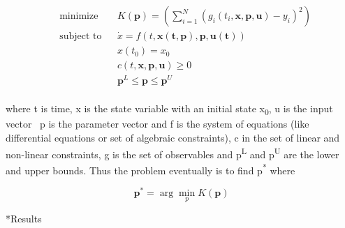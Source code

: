 \documentclass[12pt]{article}
\makeatletter
\renewcommand\section{\@startsection
	{subsection}{2}{0mm}
	{-0.2in}
	{0.05\baselineskip}
	{\normalfont\large\bfseries}}
\makeatother
\begin{document}
\begin{equation}\label{eq:static_opt}
\begin{aligned}
& \text{minimize}
& & K(\mathbf{p})=(\sum_{i=1}^N (g_i(t_i,\mathbf{x,p,u})-y_i)^2) \\
& \text{subject to}
&&\dot{x}=f(t,\mathbf{x(t,\mathbf{p}),p,u(\mathbf{t})})\\
&&&x(t_0) = x_0\\
&&&c(t,\mathbf{x,p,u}) \geqslant 0 \\
&&& \mathbf{p}^L \leqslant \mathbf{p} \leqslant \mathbf{p}^U\\
\end{aligned}
\end{equation}

where t is time, x is the state variable with an initial state x\textsubscript{0}, u is the input vector \, p is the parameter vector and f is the system of equations (like differential equations or set of algebraic constraints), c in the set of linear and non-linear constraints, g is the set of observables and p\textsuperscript{L} and p\textsuperscript{U} are the lower and upper bounds. Thus the problem eventually is to find {p}\textsuperscript{*} where

\begin{equation}\label{eq:static_opt_2}
\mathbf{p^{*}}= \arg\min_{p} K(\mathbf{p})
\end{equation}

\section*{Results}
\end{document}
